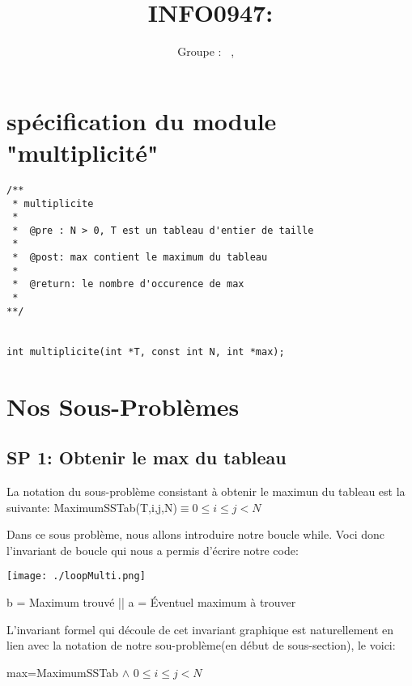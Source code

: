 \documentclass[a4paper, 11pt, oneside]{article}
\title{INFO0947: \intitule}
\author{Groupe \GrNbr : \PrenomUN~\textsc{\NomUN}, \PrenomDEUX~\textsc{\NomDEUX}}
\date{}
\newcommand{\tablemat}{~}
\renewcommand{\tablemat}{\tableofcontents}
\begin{document}
\maketitle
\newpage
\tablemat
\newpage



\section{spécification du module "multiplicité"}

\begin{lstlisting}[caption={Spécifications}]
/**
 * multiplicite
 *
 *  @pre : N > 0, T est un tableau d'entier de taille
 *
 *  @post: max contient le maximum du tableau
 *
 *  @return: le nombre d'occurence de max
 *
**/


int multiplicite(int *T, const int N, int *max);

\end{lstlisting}



\section{Nos Sous-Problèmes}

\subsection{SP 1: Obtenir le max du tableau}

La notation du sous-problème consistant à obtenir le maximun du tableau est la suivante:
MaximumSSTab(T,i,j,N)$ \equiv 0 \le i \le j < N$

\bigskip
Dans ce sous problème, nous allons introduire notre boucle while. Voci donc l'invariant de boucle qui nous a permis d'écrire notre code:

\centering
\texttt{[image: ./loopMulti.png]}

b = Maximum trouvé ||
a = Éventuel maximum à trouver

\flushleft
\setlength{\parindent}{0.5cm}

L'invariant formel qui découle de cet invariant graphique est naturellement en lien avec la notation de notre sou-problème(en début de sous-section), le voici:

max=MaximumSSTab $\land$ $ 0 \le i \le j < N$
\end{document}
